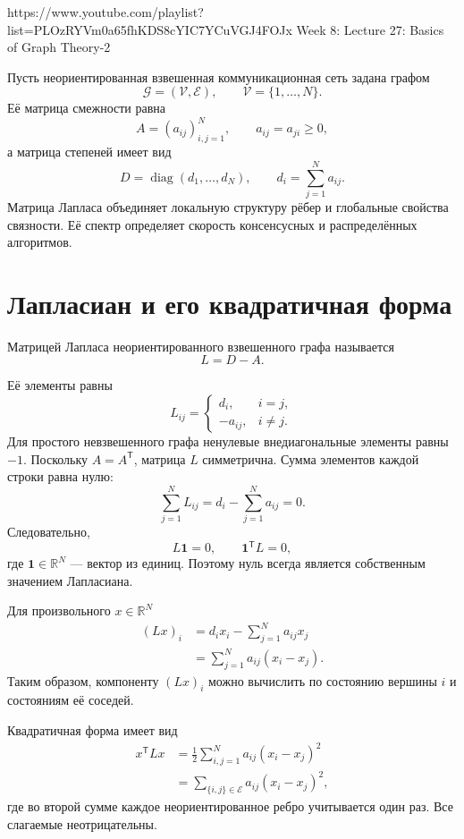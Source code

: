 
\sourcevideo
    {https://www.youtube.com/playlist?list=PLOzRYVm0a65fhKDS8cYIC7YCuVGJ4FOJx}
    {Week 8: Lecture 27: Basics of Graph Theory-2}

Пусть неориентированная взвешенная коммуникационная сеть задана
графом
\[
    \mathcal G=(\mathcal V,\mathcal E),
    \qquad
    \mathcal V=\{1,\ldots,N\}.
\]
Её матрица смежности равна
\[
    A=(a_{ij})_{i,j=1}^{N},
    \qquad
    a_{ij}=a_{ji}\ge0,
\]
а матрица степеней имеет вид
\[
    D=\operatorname{diag}(d_1,\ldots,d_N),
    \qquad
    d_i=\sum_{j=1}^{N}a_{ij}.
\]
Матрица Лапласа объединяет локальную структуру рёбер и глобальные
свойства связности. Её спектр определяет скорость консенсусных и
распределённых алгоритмов.

\section{Лапласиан и его квадратичная форма}

\begin{definition}
Матрицей Лапласа неориентированного взвешенного графа называется
\[
    L=D-A.
\]
\end{definition}

Её элементы равны
\[
    L_{ij}
    =
    \begin{cases}
        d_i, & i=j,\\
        -a_{ij}, & i\ne j.
    \end{cases}
\]
Для простого невзвешенного графа ненулевые внедиагональные элементы
равны \(-1\). Поскольку \(A=A^{\mathsf T}\), матрица \(L\)
симметрична. Сумма элементов каждой строки равна нулю:
\[
    \sum_{j=1}^{N}L_{ij}
    =
    d_i-\sum_{j=1}^{N}a_{ij}
    =
    0.
\]
Следовательно,
\[
    L\mathbf1=0,
    \qquad
    \mathbf1^{\mathsf T}L=0,
\]
где \(\mathbf1\in\mathbb R^N\) --- вектор из единиц. Поэтому нуль
всегда является собственным значением Лапласиана.

Для произвольного \(x\in\mathbb R^N\)
\[
\begin{aligned}
    (Lx)_i
    &=
    d_ix_i-\sum_{j=1}^{N}a_{ij}x_j
    \\
    &=
    \sum_{j=1}^{N}a_{ij}(x_i-x_j).
\end{aligned}
\]
Таким образом, компоненту \((Lx)_i\) можно вычислить по состоянию
вершины \(i\) и состояниям её соседей.

Квадратичная форма имеет вид
\[
\begin{aligned}
    x^{\mathsf T}Lx
    &=
    \frac12
    \sum_{i,j=1}^{N}
    a_{ij}(x_i-x_j)^2
    \\
    &=
    \sum_{\{i,j\}\in\mathcal E}
    a_{ij}(x_i-x_j)^2,
\end{aligned}
\]
где во второй сумме каждое неориентированное ребро учитывается один
раз. Все слагаемые неотрицательны.


